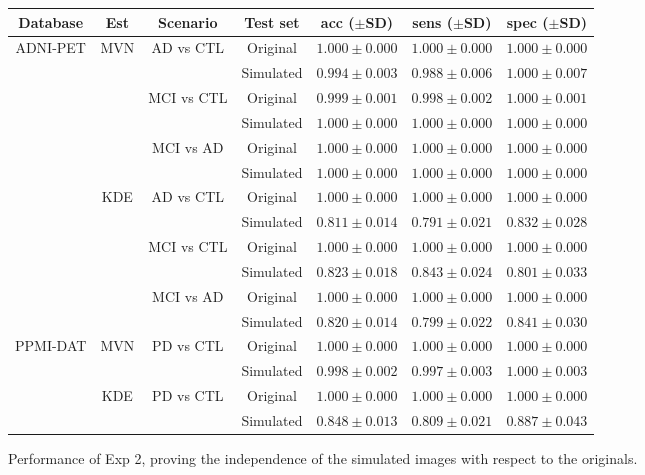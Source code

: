 \begin{bigtable}
	\begin{tabular}{ccccccc}
		\toprule
		Database & Est & Scenario & Test set & acc ($\pm$SD) & sens ($\pm$SD) & spec ($\pm$SD)\\
		\midrule
		\multirow{12}{*}{ADNI-PET} & \multirow{6}{*}{\ac{MVN}} & \multirow{2}{*}{\ac{AD} vs \ac{CTL}} & Original & $1.000 \pm 0.000 $ & $1.000 \pm 0.000 $ & $1.000 \pm 0.000 $\\
		& & &  Simulated & $0.994 \pm 0.003 $ & $0.988 \pm 0.006$ & $1.000 \pm 0.007$\\ \cline{3-7}
		& & \multirow{2}{*}{\ac{MCI} vs \ac{CTL}} & Original & $0.999 \pm 0.001 $ & $0.998 \pm 0.002 $ & $1.000 \pm 0.001 $\\
		& & & Simulated &  $1.000 \pm 0.000 $ & $1.000 \pm 0.000 $ & $1.000 \pm 0.000 $\\ \cline{3-7}
		& & \multirow{2}{*}{\ac{MCI} vs \ac{AD}} & Original & $1.000 \pm 0.000 $ & $1.000 \pm 0.000 $ & $1.000 \pm 0.000 $\\
		& & & Simulated & $1.000 \pm 0.000 $ & $1.000 \pm 0.000 $ & $1.000 \pm 0.000 $\\ \cline{2-7}
		& \multirow{6}{*}{\ac{KDE}} & \multirow{2}{*}{\ac{AD} vs \ac{CTL}} & Original & $1.000 \pm 0.000 $ & $1.000 \pm 0.000 $ & $1.000 \pm 0.000 $\\
		& & &  Simulated & $0.811 \pm 0.014 $ & $0.791 \pm 0.021$ & $0.832 \pm 0.028$\\ \cline{3-7}
		& & \multirow{2}{*}{\ac{MCI} vs \ac{CTL}} & Original & $1.000 \pm 0.000 $ & $1.000 \pm 0.000 $ & $1.000 \pm 0.000 $\\
		& & & Simulated & $0.823 \pm 0.018 $ & $0.843 \pm 0.024 $ & $0.801 \pm 0.033 $\\ \cline{3-7}
		& & \multirow{2}{*}{\ac{MCI} vs \ac{AD}} & Original & $1.000 \pm 0.000 $ & $1.000 \pm 0.000 $ & $1.000 \pm 0.000 $\\
		& & & Simulated & $0.820 \pm 0.014 $ & $0.799 \pm 0.022 $ & $0.841 \pm 0.030 $\\ 
		\midrule
		\multirow{4}{*}{PPMI-DAT} & \multirow{2}{*}{\ac{MVN}} & \multirow{2}{*}{\ac{PD} vs \ac{CTL}} & Original & $1.000 \pm 0.000 $ & $1.000 \pm 0.000 $ & $1.000 \pm 0.000 $\\
		& & &  Simulated & $0.998 \pm 0.002 $ & $0.997 \pm 0.003$ & $1.000 \pm 0.003$\\  \cline{2-7}
		& \multirow{2}{*}{\ac{KDE}} & \multirow{2}{*}{\ac{PD} vs \ac{CTL}} & Original & $1.000 \pm 0.000 $ & $1.000 \pm 0.000 $ & $1.000 \pm 0.000 $\\
		& & &  Simulated & $0.848 \pm 0.013 $ & $0.809 \pm 0.021$ & $0.887 \pm 0.043$\\ 
		\bottomrule 
	\end{tabular}
	\vspace{1em}
	\caption{Performance of Exp 2, proving the independence of the simulated images with respect to the originals.}
	\label{tab:clas2syn}
\end{bigtable}

